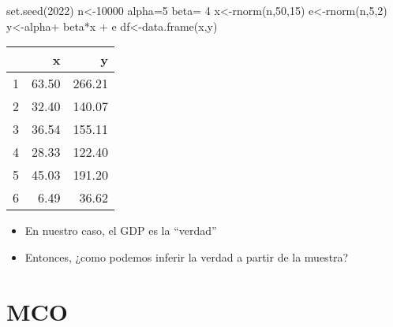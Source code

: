 \documentclass[
  ignorenonframetext,
]{beamer}
\newenvironment{Shaded}{\begin{snugshade}}{\end{snugshade}}
\newcommand{\DecValTok}[1]{\textcolor[rgb]{0.00,0.00,0.81}{#1}}
\newcommand{\FunctionTok}[1]{\textcolor[rgb]{0.00,0.00,0.00}{#1}}
\newcommand{\NormalTok}[1]{#1}
\newcommand{\OtherTok}[1]{\textcolor[rgb]{0.56,0.35,0.01}{#1}}
\newcommand{\SpecialCharTok}[1]{\textcolor[rgb]{0.00,0.00,0.00}{#1}}
\providecommand{\tightlist}{%
  \setlength{\itemsep}{0pt}\setlength{\parskip}{0pt}}
\begin{document}
\begin{frame}[fragile]{}
\protect\hypertarget{section-1}{}
\begin{Shaded}
\begin{Highlighting}[]
\FunctionTok{set.seed}\NormalTok{(}\DecValTok{2022}\NormalTok{)}
\NormalTok{n}\OtherTok{\textless{}{-}}\DecValTok{10000}
\NormalTok{alpha}\OtherTok{=}\DecValTok{5}
\NormalTok{beta}\OtherTok{=} \DecValTok{4}
\NormalTok{x}\OtherTok{\textless{}{-}}\FunctionTok{rnorm}\NormalTok{(n,}\DecValTok{50}\NormalTok{,}\DecValTok{15}\NormalTok{)}
\NormalTok{e}\OtherTok{\textless{}{-}}\FunctionTok{rnorm}\NormalTok{(n,}\DecValTok{5}\NormalTok{,}\DecValTok{2}\NormalTok{)}
\NormalTok{y}\OtherTok{\textless{}{-}}\NormalTok{alpha}\SpecialCharTok{+}\NormalTok{ beta}\SpecialCharTok{*}\NormalTok{x }\SpecialCharTok{+}\NormalTok{ e}
\NormalTok{df}\OtherTok{\textless{}{-}}\FunctionTok{data.frame}\NormalTok{(x,y)}
\end{Highlighting}
\end{Shaded}
\end{frame}

\begin{frame}{}
\protect\hypertarget{section-2}{}
\begin{table}[ht]
\centering
\begin{tabular}{rrr}
  \hline
 & x & y \\ 
  \hline
1 & 63.50 & 266.21 \\ 
  2 & 32.40 & 140.07 \\ 
  3 & 36.54 & 155.11 \\ 
  4 & 28.33 & 122.40 \\ 
  5 & 45.03 & 191.20 \\ 
  6 & 6.49 & 36.62 \\ 
   \hline
\end{tabular}
\end{table}
\end{frame}

\begin{frame}{}
\protect\hypertarget{section-3}{}
\begin{itemize}
\tightlist
\item
  En nuestro caso, el GDP es la ``verdad''
\item
  Entonces, ¿como podemos inferir la verdad a partir de la muestra?
\end{itemize}
\end{frame}

\hypertarget{mco}{%
\section{MCO}\label{mco}}
\end{document}
